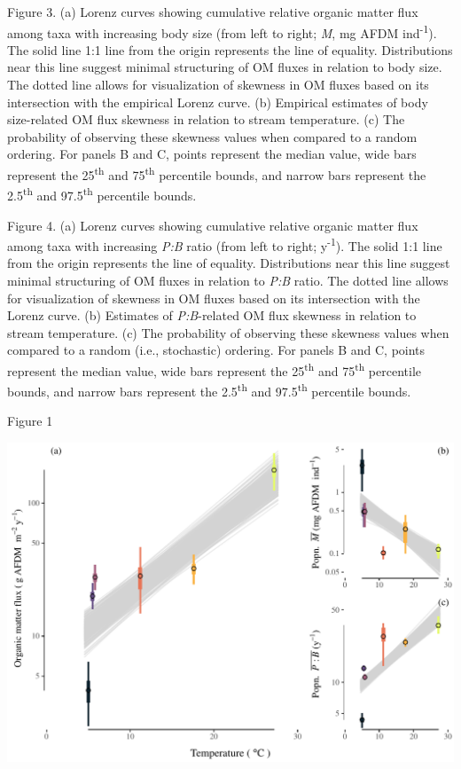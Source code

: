 \documentclass[
]{article}
\numberwithin{equation}
\begin{document}
Figure 3. (a) Lorenz curves showing cumulative relative organic matter
flux among taxa with increasing body size (from left to right; \emph{M},
mg AFDM ind\textsuperscript{-1}). The solid line 1:1 line from the
origin represents the line of equality. Distributions near this line
suggest minimal structuring of OM fluxes in relation to body size. The
dotted line allows for visualization of skewness in OM fluxes based on
its intersection with the empirical Lorenz curve. (b) Empirical
estimates of body size-related OM flux skewness in relation to stream
temperature. (c) The probability of observing these skewness values when
compared to a random ordering. For panels B and C, points represent the
median value, wide bars represent the 25\textsuperscript{th} and
75\textsuperscript{th} percentile bounds, and narrow bars represent the
2.5\textsuperscript{th} and 97.5\textsuperscript{th} percentile bounds.

Figure 4. (a) Lorenz curves showing cumulative relative organic matter
flux among taxa with increasing \emph{P:B} ratio (from left to right;
y\textsuperscript{-1}). The solid 1:1 line from the origin represents
the line of equality. Distributions near this line suggest minimal
structuring of OM fluxes in relation to \emph{P:B} ratio. The dotted
line allows for visualization of skewness in OM fluxes based on its
intersection with the Lorenz curve. (b) Estimates of \emph{P:B}-related
OM flux skewness in relation to stream temperature. (c) The probability
of observing these skewness values when compared to a random (i.e.,
stochastic) ordering. For panels B and C, points represent the median
value, wide bars represent the 25\textsuperscript{th} and
75\textsuperscript{th} percentile bounds, and narrow bars represent the
2.5\textsuperscript{th} and 97.5\textsuperscript{th} percentile bounds.

\newpage

Figure 1

\includegraphics{Junker_temp-energy-flux_accepted_files/figure-latex/figure 1-1.pdf}
\end{document}
